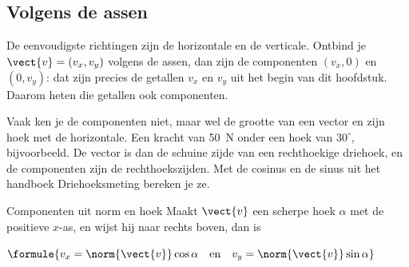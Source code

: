 \begin{oefeningen}
\end{oefeningen}

\subsection{Volgens de assen}

De eenvoudigste richtingen zijn de horizontale en de verticale. Ontbind je $\vect{v} = (v_x, v_y)$ volgens de assen, dan zijn de componenten $(v_x, 0)$ en $(0, v_y)$: dat zijn precies de getallen $v_x$ en $v_y$ uit het begin van dit hoofdstuk. Daarom heten die getallen ook componenten.

Vaak ken je de componenten niet, maar wel de grootte van een vector en zijn hoek met de horizontale. Een kracht van 50~N onder een hoek van $30^\circ$, bijvoorbeeld. De vector is dan de schuine zijde van een rechthoekige driehoek, en de componenten zijn de rechthoekszijden. Met de cosinus en de sinus uit het handboek Driehoeksmeting bereken je ze.

\begin{theorie}
\begin{minipage}[t]{.6\linewidth}
\vspace{0pt}
\begin{stelling}{Componenten uit norm en hoek}
Maakt $\vect{v}$ een scherpe hoek $\alpha$ met de positieve $x$-as, en wijst hij naar rechts boven, dan is

\vspace{1mm}
\qquad $\formule{v_x = \norm{\vect{v}}\cos\alpha \quad \text{en} \quad v_y = \norm{\vect{v}}\sin\alpha}$
\end{stelling}
\end{minipage}\hfill
\begin{minipage}[t]{.36\linewidth}
\vspace{1mm}
\centering
{}
\end{minipage}
\end{theorie}

